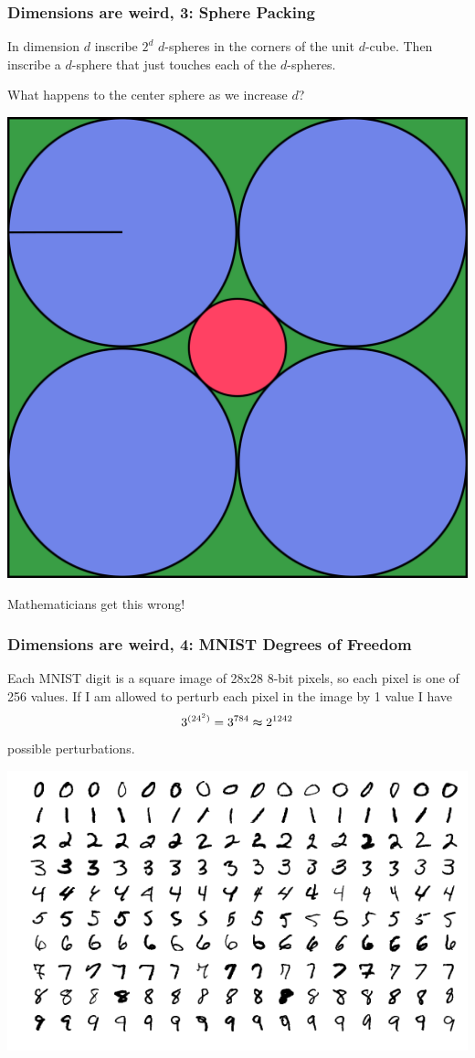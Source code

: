 \documentclass{beamer}
\begin{document}
\begin{frame}
    \frametitle{Dimensions are weird, 3: Sphere Packing}
    In dimension $d$ inscribe $2^d$ $d$-spheres in the corners of the unit $d$-cube. Then inscribe a $d$-sphere that just touches each of the $d$-spheres.

    What happens to the center sphere as we increase $d$?
    \begin{center}
    \includegraphics[scale=0.7]{sphere_illustration.png}

    Mathematicians get this wrong!
    \end{center}
\end{frame}

\begin{frame}
    \frametitle{Dimensions are weird, 4: MNIST Degrees of Freedom}
    Each MNIST digit is a square image of 28x28 8-bit pixels, so each pixel is one of 256 values. If I am allowed to perturb each pixel in the image by 1 value I have $$3^{(24^2)}=3^{784} \thickapprox 2^{1242}$$ possible perturbations.
    \begin{center}
    \includegraphics[scale=0.42]{MnistExamples.png}
    \end{center}
\end{frame}
\end{document}
